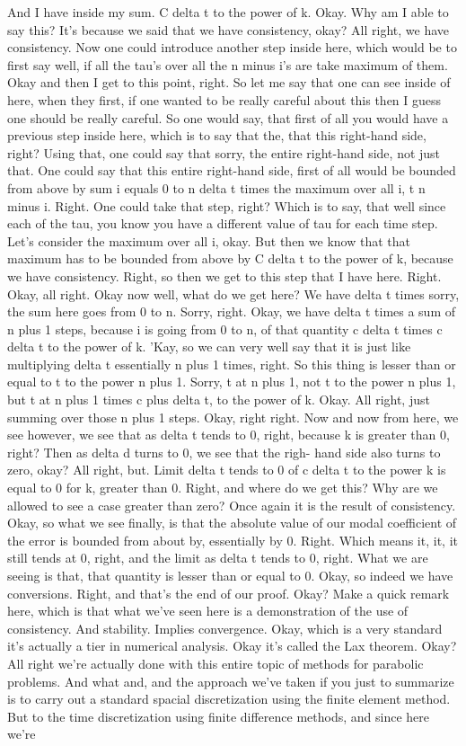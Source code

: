 \documentclass[10pt]{article}
\begin{document}
And I have inside my sum. C delta t to the power of k. Okay. Why am I able to say this? It's because we said that we have consistency, okay? All right, we have consistency. Now one could introduce another step inside here, which would be to first say well, if all the tau's over all the n minus i's are take maximum of them. Okay and then I get to this point, right. So let me say that one can see inside of here, when they first, if one wanted to be really careful about this then I guess one should be really careful. So one would say, that first of all you would have a previous step inside here, which is to say that the, that this right-hand side, right? Using that, one could say that sorry, the entire right-hand side, not just that. One could say that this entire right-hand side, first of all would be bounded from above by sum i equals 0 to n delta t times the maximum over all i, t n minus i. Right. One could take that step, right? Which is to say, that well since each of the tau, you know you have a different value of tau for each time step. Let's consider the maximum over all i, okay. But then we know that that maximum has to be bounded from above by C delta t to the power of k, because we have consistency. Right, so then we get to this step that I have here. Right. Okay, all right. Okay now well, what do we get here? We have delta t times sorry, the sum here goes from 0 to n. Sorry, right. Okay, we have delta t times a sum of n plus 1 steps, because i is going from 0 to n, of that quantity c delta t times c delta t to the power of k. 'Kay, so we can very well say that it is just like multiplying delta t essentially n plus 1 times, right. So this thing is lesser than or equal to t to the power n plus 1. Sorry, t at n plus 1, not t to the power n plus 1, but t at n plus 1 times c plus delta t, to the power of k. Okay. All right, just summing over those n plus 1 steps. Okay, right right. Now and now from here, we see however, we see that as delta t tends to 0, right, because k is greater than 0, right? Then as delta d turns to 0, we see that the righ- hand side also turns to zero, okay? All right, but. Limit delta t tends to 0 of c delta t to the power k is equal to 0 for k, greater than 0. Right, and where do we get this? Why are we allowed to see a case greater than zero? Once again it is the result of consistency. Okay, so what we see finally, is that the absolute value of our modal coefficient of the error is bounded from about by, essentially by 0. Right. Which means it, it, it still tends at 0, right, and the limit as delta t tends to 0, right. What we are seeing is that, that quantity is lesser than or equal to 0. Okay, so indeed we have conversions. Right, and that's the end of our proof. Okay? Make a quick remark here, which is that what we've seen here is a demonstration of the use of consistency. And stability. Implies convergence. Okay, which is a very standard it's actually a tier in numerical analysis. Okay it's called the Lax theorem. Okay? All right we're actually done with this entire topic of methods for parabolic problems. And what and, and the approach we've taken if you just to summarize is to carry out a standard spacial discretization using the finite element method. But to the time discretization using finite difference methods, and since here we're 
\end{document}
